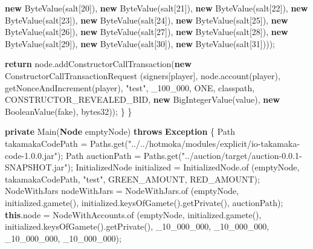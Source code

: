 \documentclass[a4paper,]{book}
\newenvironment{Shaded}{\begin{snugshade}}{\end{snugshade}}
\newcommand{\BuiltInTok}[1]{\textcolor[rgb]{0.39,0.29,0.61}{\textbf{#1}}}
\newcommand{\DecValTok}[1]{\textcolor[rgb]{0.69,0.50,0.00}{#1}}
\newcommand{\FunctionTok}[1]{\textcolor[rgb]{0.39,0.29,0.61}{#1}}
\newcommand{\KeywordTok}[1]{\textcolor[rgb]{0.12,0.11,0.11}{\textbf{#1}}}
\newcommand{\NormalTok}[1]{\textcolor[rgb]{0.12,0.11,0.11}{#1}}
\newcommand{\StringTok}[1]{\textcolor[rgb]{0.75,0.01,0.01}{#1}}
\renewenvironment{Shaded}{\begin{snugshade}\small}{\end{snugshade}}
\begin{document}
{\begin{Shaded}
\begin{Highlighting}[]
        \KeywordTok{new} \FunctionTok{ByteValue}\NormalTok{(salt[}\DecValTok{20}\NormalTok{]), }\KeywordTok{new} \FunctionTok{ByteValue}\NormalTok{(salt[}\DecValTok{21}\NormalTok{]), }\KeywordTok{new} \FunctionTok{ByteValue}\NormalTok{(salt[}\DecValTok{22}\NormalTok{]), }\KeywordTok{new} \FunctionTok{ByteValue}\NormalTok{(salt[}\DecValTok{23}\NormalTok{]),}
        \KeywordTok{new} \FunctionTok{ByteValue}\NormalTok{(salt[}\DecValTok{24}\NormalTok{]), }\KeywordTok{new} \FunctionTok{ByteValue}\NormalTok{(salt[}\DecValTok{25}\NormalTok{]), }\KeywordTok{new} \FunctionTok{ByteValue}\NormalTok{(salt[}\DecValTok{26}\NormalTok{]), }\KeywordTok{new} \FunctionTok{ByteValue}\NormalTok{(salt[}\DecValTok{27}\NormalTok{]),}
        \KeywordTok{new} \FunctionTok{ByteValue}\NormalTok{(salt[}\DecValTok{28}\NormalTok{]), }\KeywordTok{new} \FunctionTok{ByteValue}\NormalTok{(salt[}\DecValTok{29}\NormalTok{]), }\KeywordTok{new} \FunctionTok{ByteValue}\NormalTok{(salt[}\DecValTok{30}\NormalTok{]), }\KeywordTok{new} \FunctionTok{ByteValue}\NormalTok{(salt[}\DecValTok{31}\NormalTok{])));}

      \KeywordTok{return}\NormalTok{ node.}\FunctionTok{addConstructorCallTransaction}\NormalTok{(}\KeywordTok{new}\NormalTok{ ConstructorCallTransactionRequest}
\NormalTok{        (signers[player], node.}\FunctionTok{account}\NormalTok{(player),}
         \FunctionTok{getNonceAndIncrement}\NormalTok{(player), }\StringTok{"test"}\NormalTok{,}
\NormalTok{         _}\DecValTok{100_000}\NormalTok{, ONE, classpath, CONSTRUCTOR_REVEALED_BID,}
         \KeywordTok{new} \FunctionTok{BigIntegerValue}\NormalTok{(value), }\KeywordTok{new} \FunctionTok{BooleanValue}\NormalTok{(fake), bytes32));}
\NormalTok{    \}}
\NormalTok{  \}}

  \KeywordTok{private} \FunctionTok{Main}\NormalTok{(}\BuiltInTok{Node}\NormalTok{ emptyNode) }\KeywordTok{throws} \BuiltInTok{Exception}\NormalTok{ \{}
\NormalTok{    Path takamakaCodePath = Paths.}\FunctionTok{get}\NormalTok{(}\StringTok{"../../hotmoka/modules/explicit/io-takamaka-code-1.0.0.jar"}\NormalTok{);}
\NormalTok{    Path auctionPath = Paths.}\FunctionTok{get}\NormalTok{(}\StringTok{"../auction/target/auction-0.0.1-SNAPSHOT.jar"}\NormalTok{);}
\NormalTok{    InitializedNode initialized = InitializedNode.}\FunctionTok{of}
\NormalTok{      (emptyNode, takamakaCodePath, }\StringTok{"test"}\NormalTok{, GREEN_AMOUNT, RED_AMOUNT);}
\NormalTok{    NodeWithJars nodeWithJars = NodeWithJars.}\FunctionTok{of}
\NormalTok{      (emptyNode, initialized.}\FunctionTok{gamete}\NormalTok{(), initialized.}\FunctionTok{keysOfGamete}\NormalTok{().}\FunctionTok{getPrivate}\NormalTok{(),}
\NormalTok{       auctionPath);}
    \KeywordTok{this}\NormalTok{.}\FunctionTok{node}\NormalTok{ = NodeWithAccounts.}\FunctionTok{of}
\NormalTok{      (emptyNode, initialized.}\FunctionTok{gamete}\NormalTok{(), initialized.}\FunctionTok{keysOfGamete}\NormalTok{().}\FunctionTok{getPrivate}\NormalTok{(),}
\NormalTok{      _}\DecValTok{10_000_000}\NormalTok{, _}\DecValTok{10_000_000}\NormalTok{, _}\DecValTok{10_000_000}\NormalTok{, _}\DecValTok{10_000_000}\NormalTok{);}


\end{Highlighting}
\end{Shaded}}
\end{document}
